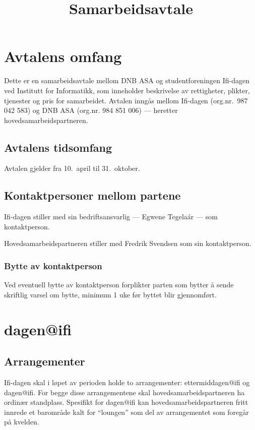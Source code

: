 \documentclass[norsk,a4paper]{article}
\title{Samarbeidsavtale}
\begin{document}
\maketitle
\thispagestyle{fancy}

\section{Avtalens omfang}
Dette er en samarbeidsavtale mellom DNB ASA og studentforeningen Ifi-dagen ved
Institutt for Informatikk, som inneholder beskrivelse av rettigheter, plikter,
tjenester og pris for samarbeidet. Avtalen inngås mellom Ifi-dagen
(org.nr.\ 987 042 583) og DNB ASA (org.nr. 984 851 006) --- heretter
hovedsamarbeidspartneren.

\subsection{Avtalens tidsomfang}
Avtalen gjelder fra 10.\ april til 31.\ oktober.

\subsection{Kontaktpersoner mellom partene}
Ifi-dagen stiller med sin bedriftsansvarlig --- Egwene Tegelaár --- som
kontaktperson.

Hovedsamarbeidspartneren stiller med Fredrik Svendsen som sin kontaktperson.

\subsubsection{Bytte av kontaktperson}
Ved eventuell bytte av kontaktperson forplikter parten som bytter å sende
skriftlig varsel om bytte, minimum 1 uke før byttet blir gjennomført.

\section{dagen@ifi}
\subsection{Arrangementer\label{sec:arrangementer}}
Ifi-dagen skal i løpet av perioden holde to arrangementer: ettermiddagen@ifi
og dagen@ifi. For begge disse arrangementene skal hovedsamarbeidspartneren ha
ordinær standplass. Spesifikt for dagen@ifi kan hovedsamarbeidspartneren fritt
innrede et barområde kalt for ``loungen'' som del av arrangementet som foregår
på kvelden.
\end{document}
